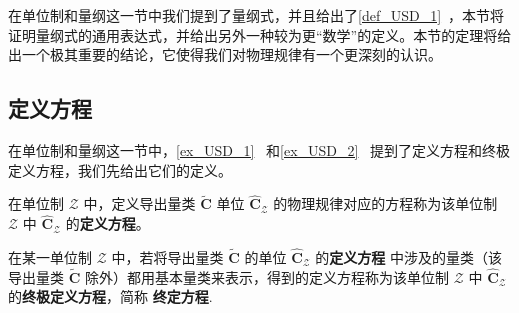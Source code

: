 
\begin{issues}
\issueTODO
\end{issues}

在单位制和量纲这一节中我们提到了量纲式，并且给出了\autoref{def_USD_1}~，本节将证明量纲式的通用表达式，并给出另外一种较为更“数学”的定义。本节的定理将给出一个极其重要的结论，它使得我们对物理规律有一个更深刻的认识。
\subsection{定义方程}
在单位制和量纲这一节中，\autoref{ex_USD_1}~ 和\autoref{ex_USD_2}~ 提到了定义方程和终极定义方程，我们先给出它们的定义。
\begin{definition}{}
在单位制 $\mathscr{Z}$ 中，定义导出量类 $\tilde{\boldsymbol{C}}$ 单位 $\hat{\boldsymbol{C}}_{\mathscr{Z}}$ 的物理规律对应的方程称为该单位制 $\mathscr{Z}$ 中 $\hat{\boldsymbol{C}}_{\mathscr{Z}}$ 的\textbf{定义方程}。
\end{definition}
\begin{definition}{}
在某一单位制 $\mathscr{Z}$ 中，若将导出量类 $\tilde{\boldsymbol{C}}$ 的单位 $\hat{\boldsymbol{C}}_{\mathscr{Z}}$ 的\textbf{定义方程} 中涉及的量类（该导出量类 $\tilde{\boldsymbol{C}}$ 除外）都用基本量类来表示，得到的定义方程称为该单位制 $\mathscr{Z}$ 中 $\hat{\boldsymbol{C}}_{\mathscr{Z}}$ 的\textbf{终极定义方程}，简称 \textbf{终定方程}.
\end{definition}

